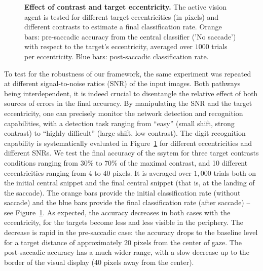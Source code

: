 \begin{figure}[t!]%
	\caption{
		{\bf Effect of contrast and target eccentricity.} %
		The active vision agent is tested for different target eccentricities (in pixels) and different contrasts to estimate a final classification rate. Orange bars: pre-saccadic accuracy from the central classifier ('No saccade') with respect to the target's eccentricity, averaged over $1000$ trials per eccentricity. Blue bars: post-saccadic classification rate. %
		\label{fig:results}}%
\end{figure}%
To test for the robustness of our framework, the same experiment was repeated at different signal-to-noise ratios (SNR) of the input images. Both pathways being interdependent, it is indeed crucial to disentangle the relative effect of both sources of errors in the final accuracy. By manipulating the SNR and the target eccentricity, one can precisely monitor the network detection and recognition capabilities, with a detection task ranging from ``easy'' (small shift, strong contrast) to ``highly difficult'' (large shift, low contrast). The digit recognition capability is systematically evaluated in Figure~\ref{fig:results} for different eccentricities and different SNRs. We test the final accuracy of the ssytem for three target contrasts conditions ranging from 30\% to 70\% of the maximal contrast, and 10 different eccentricities ranging from 4 to 40 pixels. It is averaged over $1,000$ trials both on the initial central snippet and the final central snippet (that is, at the landing of the saccade). The orange bars provide the initial classification rate (without saccade) and the blue bars provide the final classification rate (after saccade) -- see Figure~\ref{fig:results}. As expected, the accuracy decreases in both cases with the eccentricity, for the targets become less and less visible in the periphery. The decrease is rapid in the pre-saccadic case: the accuracy drops to the baseline level for a target distance of approximately $20$ pixels from the center of gaze. The post-saccadic accuracy has a much wider range, with a slow decrease up to the border of the visual display (40 pixels away from the center).
